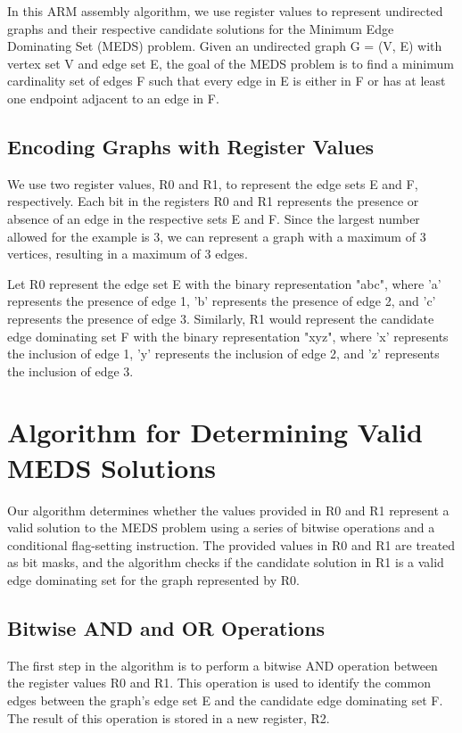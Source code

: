 In this ARM assembly algorithm, we use register values to represent undirected graphs and their respective candidate solutions for the Minimum Edge Dominating Set (MEDS) problem. Given an undirected graph G = (V, E) with vertex set V and edge set E, the goal of the MEDS problem is to find a minimum cardinality set of edges F such that every edge in E is either in F or has at least one endpoint adjacent to an edge in F.

\subsection{Encoding Graphs with Register Values}

We use two register values, R0 and R1, to represent the edge sets E and F, respectively. Each bit in the registers R0 and R1 represents the presence or absence of an edge in the respective sets E and F. Since the largest number allowed for the example is 3, we can represent a graph with a maximum of 3 vertices, resulting in a maximum of 3 edges.

Let R0 represent the edge set E with the binary representation "abc", where 'a' represents the presence of edge 1, 'b' represents the presence of edge 2, and 'c' represents the presence of edge 3. Similarly, R1 would represent the candidate edge dominating set F with the binary representation "xyz", where 'x' represents the inclusion of edge 1, 'y' represents the inclusion of edge 2, and 'z' represents the inclusion of edge 3.

\section{Algorithm for Determining Valid MEDS Solutions}

Our algorithm determines whether the values provided in R0 and R1 represent a valid solution to the MEDS problem using a series of bitwise operations and a conditional flag-setting instruction. The provided values in R0 and R1 are treated as bit masks, and the algorithm checks if the candidate solution in R1 is a valid edge dominating set for the graph represented by R0.

\subsection{Bitwise AND and OR Operations}

The first step in the algorithm is to perform a bitwise AND operation between the register values R0 and R1. This operation is used to identify the common edges between the graph's edge set E and the candidate edge dominating set F. The result of this operation is stored in a new register, R2.

